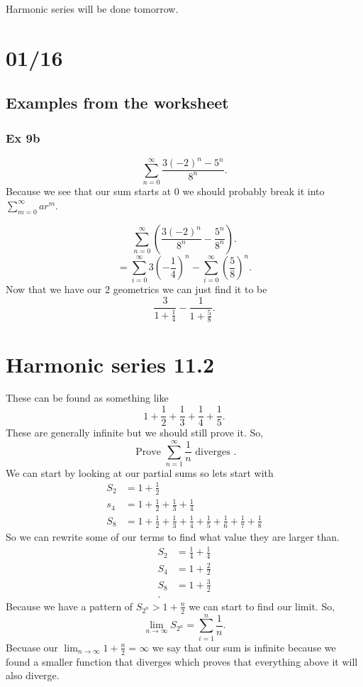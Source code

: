 Harmonic series will be done tomorrow. 
\section{01/16}%
\label{sec:01/16}
\subsection{Examples from the worksheet}%
\label{sub:Examples from the worksheet}

\subsubsection*{Ex 9b}
\[
\sum_{ n=0 } ^{ \infty } \frac{ 3\left( -2 \right) ^{ n }-5^{ n } }{ 8^{ n } }
.\] 
Because we see that our sum starts at 0 we should probably break it into $ \sum_{ m=0 } ^{ \infty } ar^{ m } $.

\[
\sum_{ n=0 } ^{ \infty } \left( \frac{ 3\left( -2 \right) ^{ n } }{ 8^{ n } }-\frac{ 5^{ n } }{ 8^{ n } } \right) 
.\] 
\[
=\sum_{ i=0 } ^{ \infty } 3\left( -\frac{ 1 }{ 4 }  \right) ^{ n }-\sum_{ i=0 } ^{ \infty } \left( \frac{ 5 }{ 8 }  \right) ^{ n } 
.\] 
Now that we have our 2 geometrics we can just find it to be
\[
\frac{ 3 }{ 1+\frac{ 1 }{ 4 }  } -\frac{ 1 }{ 1+\frac{ 5 }{ 8 }  } 
.\] 

\section{Harmonic series 11.2}%
\label{sec:Harmonic series 11.2}

These can be found as something like 
\[
1+\frac{ 1 }{ 2 } +\frac{ 1 }{ 3 } +\frac{ 1 }{ 4 } +\frac{ 1 }{ 5 } 
.\] 
These are generally infinite but we should still prove it. So,
\[
\text{ Prove } \sum_{ n=1 } ^{ \infty } \frac{ 1 }{ n } \text{ diverges }
.\] 
We can start by looking at our partial sums so lets start with
\begin{align*}
	S_2 &= 1+ \frac{ 1 }{ 2 } \\
	s_4 &= 1+ \frac{ 1 }{ 2 } +\frac{ 1 }{ 3 } +\frac{ 1 }{ 4 } \\
	S_8 &= 1+\frac{ 1 }{ 2 } +\frac{ 1 }{ 3 } +\frac{ 1 }{ 4 } +\frac{ 1 }{ 5 } +\frac{ 1 }{ 6 } +\frac{ 1 }{ 7 } +\frac{ 1 }{ 8 } 
\end{align*}
So we can rewrite some of our terms to find what value they are larger than. 
\begin{align*}
S_2 &= \frac{ 1 }{ 4 } +\frac{ 1 }{ 4 }  \\
S_4 &= 1+\frac{ 2 }{ 2 }  \\
S_8 &= 1+\frac{ 3 }{ 2 }  \\
.\end{align*}
Because we have a pattern of $ S_{ 2^{ n } }>1+\frac{ n }{ 2 }  $ we can start to find our limit. So,
\[
\lim_{ n \to \infty} S_{ 2^{ n } }=\sum_{ i=1 } ^{ n } \frac{ 1 }{ n } 
.\] 
Becuase our $ \lim_{ n \to \infty} 1+\frac{ n }{ 2 } = \infty $ we say that our sum is infinite because we found a smaller function that diverges which proves that everything above it will also diverge. 

